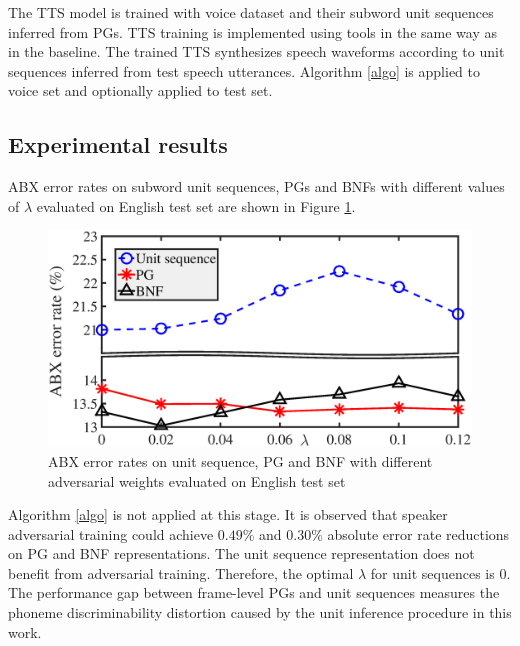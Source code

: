 \documentclass[a4paper]{article}
\begin{document}
The TTS model is trained with voice dataset and their subword unit sequences inferred from PGs. TTS training is implemented using tools \cite{wu2016merlin}
in the same way as  in the baseline.
The trained TTS synthesizes speech waveforms according to unit sequences inferred from test speech utterances. Algorithm \ref{algo} is applied to voice set and optionally applied to test set.
\subsection{Experimental results}
ABX error rates on subword unit sequences, PGs and BNFs with different values of $\lambda$ evaluated on English test set are shown in Figure \ref{fig:adv_results_zs19}. 
\begin{figure}[t]
    \centering
    \includegraphics[width=0.66\linewidth]{adv_results2_zs19_export_setup.eps}
    \caption{ABX error rates on unit sequence, PG and BNF with different adversarial weights evaluated on English test set}
    \label{fig:adv_results_zs19}
\end{figure}
Algorithm \ref{algo} is not applied at this stage. It is observed that speaker adversarial training could achieve  $0.49\%$ and $0.30\%$ absolute error rate reductions on PG and BNF representations.
The unit sequence representation  does not benefit from adversarial training. Therefore, the optimal $\lambda$ for  unit sequences is $0$.
The  performance gap between frame-level PGs and unit sequences measures the phoneme discriminability distortion caused by the unit inference procedure in this work. 
 
\end{document}
